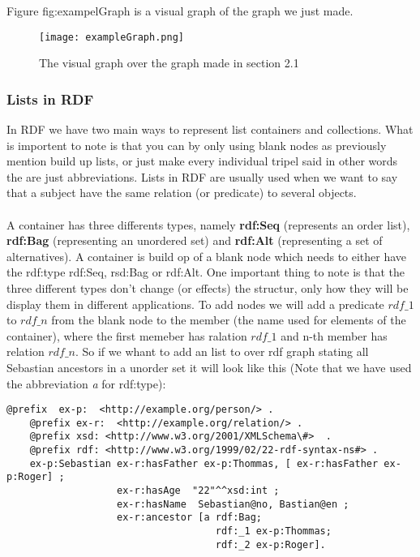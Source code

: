 Figure \refname{fig:exampelGraph} is a visual graph of the graph we just made.
\begin{figure}
    \centering
    \texttt{[image: exampleGraph.png]}
    \caption{The visual graph over the graph made in section 2.1}
    \label{fig:exampelGraph}
\end{figure}

\subsubsection{Lists in RDF}
In RDF we have two main ways to represent list containers and collections. What is importent to
note is that you can by only using blank nodes as previously mention build up lists, or just
make every individual tripel said in other words the are just abbreviations. Lists in RDF are usually
used when we want to say that a subject have the same relation (or predicate) to several objects.
\\ \\ 
A container has three differents types, namely \textbf{rdf:Seq} (represents an order list), 
\textbf{rdf:Bag} (representing an unordered set) and \textbf{rdf:Alt} (representing a set of alternatives).
A container is build op of a blank node which needs to either have the rdf:type
rdf:Seq, rsd:Bag or rdf:Alt. One important thing to note is that the three different types
don't change (or effects) the structur, only how they will be display them in different applications.
To add nodes we will add a predicate $rdf\_1$ to $rdf\_n$ from the blank node to the member (the name used for 
elements of the container), where the first memeber has ralation $rdf\_1$ and n-th member has relation $rdf\_n$.
So if we whant to add an list to over rdf graph stating all Sebastian ancestors in a unorder set 
it will look like this (Note that we have used the abbreviation \textit{a} for rdf:type):
\begin{lstlisting}[frame=single, language=turtle]
    @prefix  ex-p:  <http://example.org/person/> . 
    @prefix ex-r:  <http://example.org/relation/> . 
    @prefix xsd: <http://www.w3.org/2001/XMLSchema\#>  . 
    @prefix rdf: <http://www.w3.org/1999/02/22-rdf-syntax-ns#> .
    ex-p:Sebastian ex-r:hasFather ex-p:Thommas, [ ex-r:hasFather ex-p:Roger] ; 
                   ex-r:hasAge  "22"^^xsd:int ; 
                   ex-r:hasName  Sebastian@no, Bastian@en ;
                   ex-r:ancestor [a rdf:Bag; 
                                    rdf:_1 ex-p:Thommas; 
                                    rdf:_2 ex-p:Roger].
\end{lstlisting}
